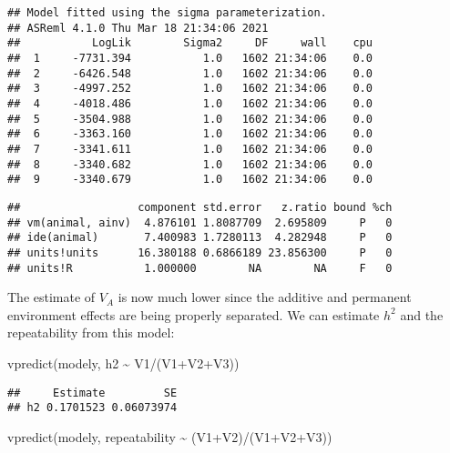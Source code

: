 \documentclass[
  12pt,
]{book}
\newenvironment{Shaded}{\begin{snugshade}}{\end{snugshade}}
\newcommand{\FunctionTok}[1]{\textcolor[rgb]{0.00,0.00,0.00}{#1}}
\newcommand{\NormalTok}[1]{#1}
\newcommand{\SpecialCharTok}[1]{\textcolor[rgb]{0.00,0.00,0.00}{#1}}
\begin{document}
\begin{verbatim}
## Model fitted using the sigma parameterization.
## ASReml 4.1.0 Thu Mar 18 21:34:06 2021
##           LogLik        Sigma2     DF     wall    cpu
##  1     -7731.394           1.0   1602 21:34:06    0.0
##  2     -6426.548           1.0   1602 21:34:06    0.0
##  3     -4997.252           1.0   1602 21:34:06    0.0
##  4     -4018.486           1.0   1602 21:34:06    0.0
##  5     -3504.988           1.0   1602 21:34:06    0.0
##  6     -3363.160           1.0   1602 21:34:06    0.0
##  7     -3341.611           1.0   1602 21:34:06    0.0
##  8     -3340.682           1.0   1602 21:34:06    0.0
##  9     -3340.679           1.0   1602 21:34:06    0.0
\end{verbatim}

\begin{Shaded}
\end{Shaded}

\begin{verbatim}
##                  component std.error   z.ratio bound %ch
## vm(animal, ainv)  4.876101 1.8087709  2.695809     P   0
## ide(animal)       7.400983 1.7280113  4.282948     P   0
## units!units      16.380188 0.6866189 23.856300     P   0
## units!R           1.000000        NA        NA     F   0
\end{verbatim}

The estimate of \(V_A\) is now much lower since the additive and permanent environment effects are being properly separated. We can estimate \(h^2\) and the repeatability from this model:

\begin{Shaded}
\begin{Highlighting}[]
\FunctionTok{vpredict}\NormalTok{(modely, h2 }\SpecialCharTok{\textasciitilde{}}\NormalTok{ V1}\SpecialCharTok{/}\NormalTok{(V1}\SpecialCharTok{+}\NormalTok{V2}\SpecialCharTok{+}\NormalTok{V3))}
\end{Highlighting}
\end{Shaded}

\begin{verbatim}
##     Estimate         SE
## h2 0.1701523 0.06073974
\end{verbatim}

\begin{Shaded}
\begin{Highlighting}[]
\FunctionTok{vpredict}\NormalTok{(modely, repeatability }\SpecialCharTok{\textasciitilde{}}\NormalTok{ (V1}\SpecialCharTok{+}\NormalTok{V2)}\SpecialCharTok{/}\NormalTok{(V1}\SpecialCharTok{+}\NormalTok{V2}\SpecialCharTok{+}\NormalTok{V3))}
\end{Highlighting}
\end{Shaded}
\end{document}
